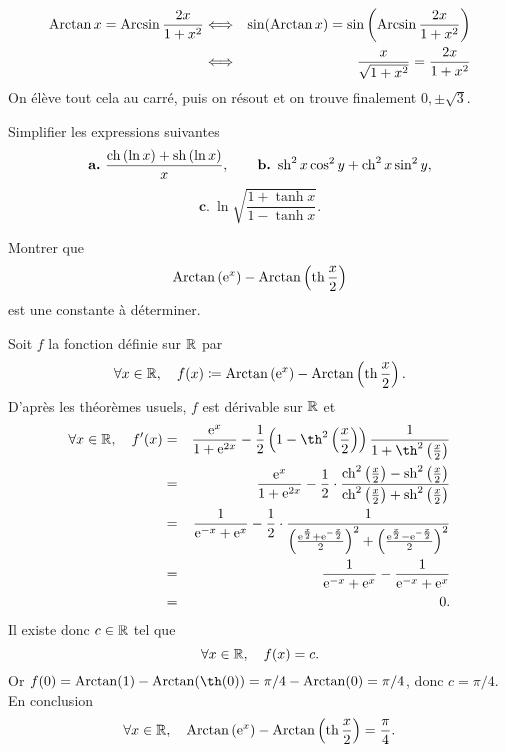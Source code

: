 \documentclass{magnolia}
\begin{document}
  \begin{sol}
  \begin{eqnarray*}
  \operatorname{Arctan} x=\operatorname{Arcsin}\frac{2x}{1+x^2}&\Longleftrightarrow & \sin(\operatorname{Arctan} x)=\sin\left(\operatorname{Arcsin}\frac{2x}{1+x^2}\right)\\
  &\Longleftrightarrow & \frac{x}{\sqrt{1+x^2}}=\frac{2x}{1+x^2}
  \end{eqnarray*}
  On élève tout cela au carré, puis on résout et on trouve finalement $0,\pm\sqrt{3}$.
  \end{sol}




Simplifier les expressions suivantes
\[\textbf{a.}\ \frac{\operatorname{ch}\left(\ln x\right)+\operatorname{sh}\left(\ln x\right)}{x}, \qquad \textbf{b.}\ \operatorname{sh}^2x\cos^2y+\operatorname{ch}^2x\sin^2y,\]
\[\textbf{c.}\ \ln\sqrt{\frac{1+\tanh x}{1-\tanh x}}.\]

Montrer que
\[\operatorname{Arctan}\left({\rm e}^x\right)-\operatorname{Arctan}\left(\operatorname{th}\frac{x}{2}\right)\]
est une constante à déterminer.
\begin{sol}
Soit $f$ la fonction définie sur $\mathbb{R}$ par
\[\forall x\in\mathbb{R},\quad f(x)\coloneqq \operatorname{Arctan}\left({\rm e}^x\right)-\operatorname{Arctan}\left(\operatorname{th}\frac{x}{2}\right).\]
D'après les théorèmes usuels, $f$ est dérivable sur $\mathbb{R}$ et
\begin{eqnarray*}
\forall x\in\R\qsep f'(x)
&=& \frac{\e^x}{1+\e^{2x}}-\frac{1}{2}\p{1-\th^2\p{\frac{x}{2}}}\frac{1}{1+\th^2\p{\frac{x}{2}}}\\
&=& \frac{\e^x}{1+\e^{2x}}-\frac{1}{2}\cdot\frac{\ch^2\p{\frac{x}{2}}-\sh^2\p{\frac{x}{2}}}{\ch^2\p{\frac{x}{2}}+\sh^2\p{\frac{x}{2}}}\\
&=& \frac{1}{\e^{-x}+\e^{x}}-\frac{1}{2}\cdot\frac{1}{\p{\frac{\e^{\frac{x}{2}}+\e^{-\frac{x}{2}}}{2}}^2+\p{\frac{\e^{\frac{x}{2}}-\e^{-\frac{x}{2}}}{2}}^2}\\
&=& \frac{1}{\e^{-x}+\e^{x}} - \frac{1}{\e^{-x}+\e^{x}}\\
&=& 0.
\end{eqnarray*}
Il existe donc $c\in\mathbb{R}$ tel que
\[\forall x\in\mathbb{R},\quad f(x)=c.\]
Or $f(0)=\arctan(1)-\arctan(\th(0))=\pi/4-\arctan(0)=\pi/4$, donc $c=\pi/4$. En conclusion 
\[\forall x\in\mathbb{R},\quad \operatorname{Arctan}\left({\rm e}^x\right)-\operatorname{Arctan}\left(\operatorname{th}\frac{x}{2}\right)=\frac{\pi}{4}.\]
\end{sol}
\end{document}
